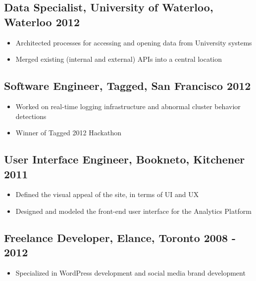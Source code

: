 \documentclass[10pt, oneside]{resume}                            %
\newcommand{\pspace}
{
  \vspace{-0.05 in}
}\pspace
\newcommand{\li}{-0.07 in}
\begin{document}
  \subsection*{\normalsize{\bfseries Data Specialist}, University of Waterloo, Waterloo \hfill 2012}
  \pspace
  \begin{itemize}
  \setlength{\itemsep}{2pt}
    \item Architected processes for accessing and opening data from University systems
    \vspace{\li}
    \item Merged existing (internal and external) APIs into a central location
    \vspace{\li}
  \end{itemize}
  \vspace{-0.18 in}


  \subsection*{\normalsize{\bfseries Software Engineer}, Tagged, San Francisco \hfill 2012}
  \pspace
  \begin{itemize}
  \setlength{\itemsep}{2pt}
    \item Worked on real-time logging infrastructure and abnormal cluster behavior detections
    \vspace{\li}
    \item Winner of Tagged 2012 Hackathon
    \vspace{\li}
  \end{itemize}
  \vspace{-0.18 in}

  \subsection*{\normalsize{\bfseries User Interface Engineer}, Bookneto, Kitchener \hfill 2011}
  \pspace
  \begin{itemize}
  \setlength{\itemsep}{2pt}
    \item Defined the visual appeal of the site, in terms of UI and UX
    \vspace{\li}
    \item Designed and modeled the front-end user interface for the Analytics Platform
    \vspace{\li}
  \end{itemize}
  \vspace{-0.18 in}

  \subsection*{\normalsize{\bfseries Freelance Developer}, Elance, Toronto \hfill 2008 - 2012}
  \pspace
  \begin{itemize}
  \setlength{\itemsep}{2pt}
    \item Specialized in WordPress development and social media brand development
    \vspace{\li}
  \end{itemize}
  \vspace{-0.18 in}
\end{document}
